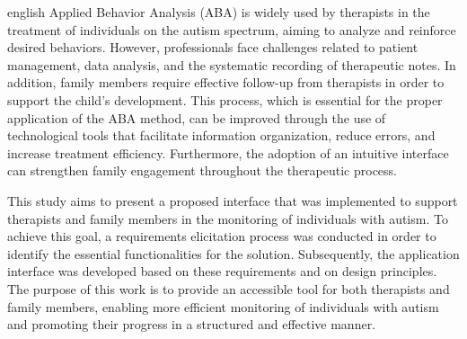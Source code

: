\begin{resumo}[Abstract]
 \begin{otherlanguage*}{english}
    Applied Behavior Analysis (ABA) is widely used by therapists in the treatment of individuals on the autism spectrum, aiming to analyze and reinforce desired behaviors. However, professionals face challenges related to patient management, data analysis, and the systematic recording of therapeutic notes. In addition, family members require effective follow-up from therapists in order to support the child’s development. This process, which is essential for the proper application of the ABA method, can be improved through the use of technological tools that facilitate information organization, reduce errors, and increase treatment efficiency. Furthermore, the adoption of an intuitive interface can strengthen family engagement throughout the therapeutic process.

    This study aims to present a proposed interface that was implemented to support therapists and family members in the monitoring of individuals with autism. To achieve this goal, a requirements elicitation process was conducted in order to identify the essential functionalities for the solution. Subsequently, the application interface was developed based on these requirements and on design principles. The purpose of this work is to provide an accessible tool for both therapists and family members, enabling more efficient monitoring of individuals with autism and promoting their progress in a structured and effective manner.
 \end{otherlanguage*}
\end{resumo}


\listoffigures*






\cleardoublepage
{}
\tableofcontents*
\cleardoublepage

